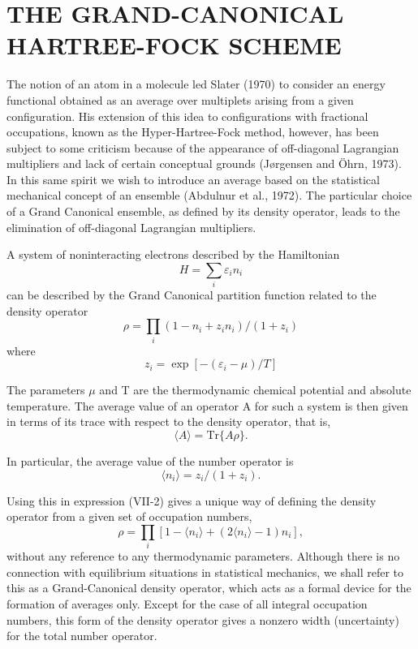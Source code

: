 \documentclass[12pt,letterpaper]{report}
\begin{document}
\chapter{THE GRAND-CANONICAL HARTREE-FOCK SCHEME}

The notion of an atom in a molecule led Slater (1970) to consider an energy functional obtained as an average over multiplets arising from a given configuration. His extension of this idea to configurations with fractional occupations, known as the Hyper-Hartree-Fock method, however, has been subject to some criticism because of the appearance of off-diagonal Lagrangian multipliers and lack of certain conceptual grounds (Jørgensen and Öhrn, 1973). In this same spirit we wish to introduce an average based on the statistical mechanical concept of an ensemble (Abdulnur et al., 1972). The particular choice of a Grand Canonical ensemble, as defined by its density operator, leads to the elimination of off-diagonal Lagrangian multipliers.

A system of noninteracting electrons described by the Hamiltonian
\begin{equation}
H = \sum_i \varepsilon_i n_i
\end{equation}
can be described by the Grand Canonical partition function related to the density operator
\begin{equation}
\rho = \prod_i (1 - n_i + z_i n_i)/(1 + z_i)
\end{equation}
where
\begin{equation}
z_i = \exp[-(\varepsilon_i - \mu)/T]
\end{equation}

The parameters $\mu$ and T are the thermodynamic chemical potential and absolute temperature. The average value of an operator A for such a system is then given in terms of its trace with respect to the density operator, that is,
\begin{equation}
\langle A \rangle = \text{Tr}\{A\rho\}.
\end{equation}

In particular, the average value of the number operator is
\begin{equation}
\langle n_i \rangle = z_i/(1 + z_i).
\end{equation}

Using this in expression (VII-2) gives a unique way of defining the density operator from a given set of occupation numbers,
\begin{equation}
\rho = \prod_i [1 - \langle n_i \rangle + (2\langle n_i \rangle - 1)n_i],
\end{equation}
without any reference to any thermodynamic parameters. Although there is no connection with equilibrium situations in statistical mechanics, we shall refer to this as a Grand-Canonical density operator, which acts as a formal device for the formation of averages only. Except for the case of all integral occupation numbers, this form of the density operator gives a nonzero width (uncertainty) for the total number operator.
\end{document}
